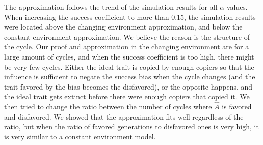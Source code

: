 \documentclass[12pt]{extarticle}
\begin{document}
The approximation follows the trend of the simulation results for all $\alpha$ values.
When increasing the success coefficient to more than 0.15, the simulation results were located above the changing environment approximation, and below the constant environment approximation. We believe the reason is the structure of the cycle.
Our proof and approximation in the changing environment are for a large amount of cycles, and when the success coefficient is too high, there might be very few cycles. Either the ideal trait is copied by enough copiers so that the influence is sufficient to negate the success bias when the cycle changes (and the trait favored by the bias becomes the disfavored), or the opposite happens, and the ideal trait gets extinct before there were enough copiers that copied it.
We then tried to change the ratio between the number of cycles where $\hat{A}$ is favored and disfavored. We showed that the approximation fits well regardless of the ratio, but when the ratio of favored generations to disfavored ones is very high, it is very similar to a constant environment model.
\end{document}
